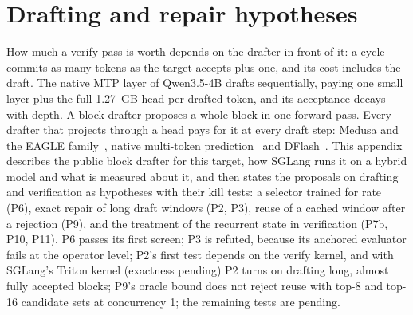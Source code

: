 \section{Drafting and repair hypotheses}\label{app:drafting}\label{sec:drafting}
How much a verify pass is worth depends on the drafter in front of it: a cycle commits as many tokens as the target accepts plus one, and its cost includes the draft. The native MTP layer of Qwen3.5-4B drafts sequentially, paying one small layer plus the full 1.27~GB head per drafted token, and its acceptance decays with depth. A block drafter proposes a whole block in one forward pass. Every drafter that projects through a head pays for it at every draft step: Medusa and the EAGLE family~\cite{medusa,eagle,eagle2,eagle3}, native multi-token prediction~\cite{gloeckle2024,deepseekv3} and DFlash~\cite{dflashpaper}. This appendix describes the public block drafter for this target, how SGLang runs it on a hybrid model and what is measured about it, and then states the proposals on drafting and verification as hypotheses with their kill tests: a selector trained for rate (P6), exact repair of long draft windows (P2, P3), reuse of a cached window after a rejection (P9), and the treatment of the recurrent state in verification (P7b, P10, P11). P6 passes its first screen; P3 is refuted, because its anchored evaluator fails at the operator level; P2's first test depends on the verify kernel, and with SGLang's Triton kernel (exactness pending) P2 turns on drafting long, almost fully accepted blocks; P9's oracle bound does not reject reuse with top-8 and top-16 candidate sets at concurrency 1; the remaining tests are pending.

